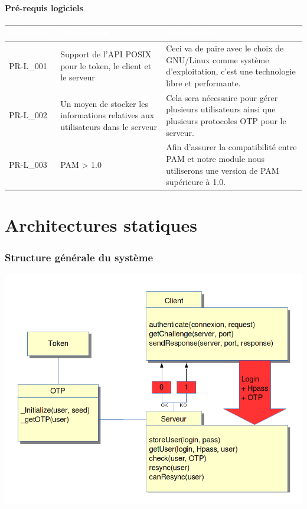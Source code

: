 \documentclass{"../../res/univ-projet"}
\begin{document}
\subsection{Pré-requis logiciels}
\begin{tabular}{|p{}|p{}|p{}|}
    \hline
    \rowcolor{gray}
    \textcolor{white}{\bfseries Identifiant} & 
    \textcolor{white}{\bfseries Description} &
    \textcolor{white}{\bfseries Justification} \\
    \hline
    PR-L\_001 &
    Support de l'API POSIX pour le token, le client et le serveur &
    Ceci va de paire avec le choix de GNU/Linux comme système d'exploitation,
    c'est une technologie libre et performante.\\
    \hline
    PR-L\_002 &
    Un moyen de stocker les informations relatives aux utilisateurs dans le serveur&
    Cela sera nécessaire pour gérer plusieurs utilisateurs ainsi que plusieurs protocoles
    OTP pour le serveur.\\
    \hline
    PR-L\_003 &
    PAM > 1.0 &
    Afin d'assurer la compatibilité entre PAM et notre module nous utiliserons
    une version de PAM supérieure à 1.0.\\
    \hline
\end{tabular}


\part*{Architectures statiques}
\section{Structure générale du système}
\includegraphics[width=\textwidth]{../graphics/architecture.png}
\end{document}
